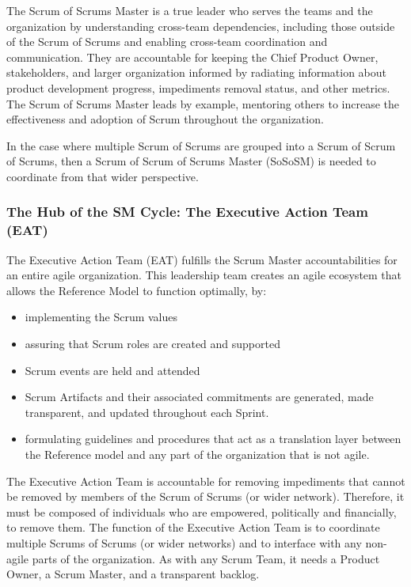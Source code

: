 \documentclass[12pt,a4paper,parskip=full]{scrartcl}
\begin{document}
The Scrum of Scrums Master is a true leader who serves the teams and the organization by understanding cross-team dependencies, including those outside of the Scrum of Scrums and enabling cross-team coordination and communication. They are accountable for keeping the Chief Product Owner, stakeholders, and larger organization informed by radiating information about product development progress, impediments removal status, and other metrics. The Scrum of Scrums Master leads by example, mentoring others to increase the effectiveness and adoption of Scrum throughout the organization.

In the case where multiple Scrum of Scrums are grouped into a Scrum of Scrum of Scrums, then a Scrum of Scrum of Scrums Master (SoSoSM) is needed to coordinate from that wider perspective.


\subsubsection{The Hub of the SM Cycle: The Executive Action Team
(EAT)}\label{the-hub-of-the-sm-cycle}

The Executive Action Team (EAT) fulfills the Scrum Master accountabilities for an entire agile organization. This leadership team creates an agile ecosystem that allows the Reference Model to function optimally, by:

\begin{itemize}
\itemsep1pt\parskip0pt
\item
  implementing the Scrum values
\item
  assuring that Scrum roles are created and supported
\item
  Scrum events are held and attended
\item
 Scrum Artifacts and their associated commitments are generated, made transparent, and updated throughout each Sprint.
\item
 formulating guidelines and procedures that act as a translation layer between the Reference model and any part of the organization that is not agile.
\end{itemize}

The Executive Action Team is accountable for removing impediments that cannot be removed by members of the Scrum of Scrums (or wider network). Therefore, it must be composed of individuals who are empowered, politically and financially, to remove them. The function of the Executive Action Team is to coordinate multiple Scrums of Scrums (or wider networks) and to interface with any non-agile parts of the organization. As with any Scrum Team, it needs a Product Owner, a Scrum Master, and a transparent backlog.
\end{document}
